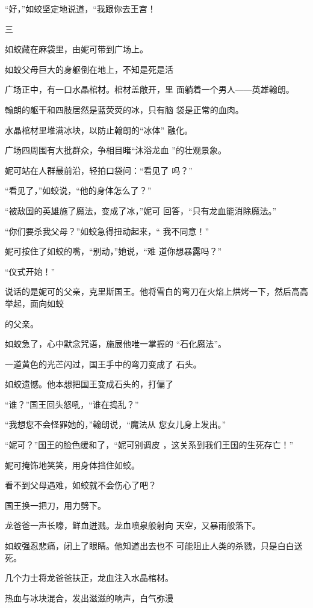 \documentclass{article}
\begin{document}
“好，”如蛟坚定地说道，“我跟你去王宫！


三 


如蛟藏在麻袋里，由妮可带到广场上。 

如蛟父母巨大的身躯倒在地上，不知是死是活

广场正中，有一口水晶棺材。棺材盖敞开，里
面躺着一个男人——英雄翰朗。 

翰朗的躯干和四肢居然是蓝荧荧的冰，只有脑
袋是正常的血肉。 

水晶棺材里堆满冰块，以防止翰朗的“冰体”
融化。 

\newpage

广场四周围有大批群众，争相目睹“沐浴龙血
”的壮观景象。 

妮可站在人群最前沿，轻拍口袋问：“看见了
吗？” 

“看见了，”如蛟说，“他的身体怎么了？”

“被敌国的英雄施了魔法，变成了冰，”妮可
回答，“只有龙血能消除魔法。” 

“你们要杀我父母？”如蛟急得扭动起来，“
我不同意！” 

妮可按住了如蛟的嘴，“别动，”她说，“难
道你想暴露吗？” 


“仪式开始！” 

说话的是妮可的父亲，克里斯国王。他将雪白的弯刀在火焰上烘烤一下，然后高高举起，面向如蛟
\newpage

的父亲。 

如蛟急了，心中默念咒语，施展他唯一掌握的
“石化魔法”。 

一道黄色的光芒闪过，国王手中的弯刀变成了
石头。 

如蛟遗憾。他本想把国王变成石头的，打偏了


“谁？”国王回头怒吼，“谁在捣乱？” 

“我想您不会怪罪她的，”翰朗说，“魔法从
您女儿身上发出。” 

“妮可？”国王的脸色缓和了，“妮可别调皮
，这关系到我们王国的生死存亡！” 


妮可掩饰地笑笑，用身体挡住如蛟。 


\newpage

看不到父母遇难，如蛟就不会伤心了吧？ 


国王换一把刀，用力劈下。 

龙爸爸一声长嚎，鲜血迸溅。龙血喷泉般射向
天空，又暴雨般落下。 

如蛟强忍悲痛，闭上了眼睛。他知道出去也不
可能阻止人类的杀戮，只是白白送死。 

几个力士将龙爸爸扶正，龙血注入水晶棺材。

热血与冰块混合，发出滋滋的响声，白气弥漫
\end{document}
